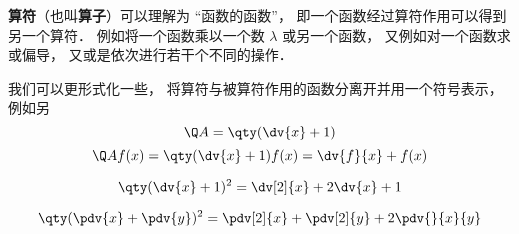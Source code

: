 
\textbf{算符}（也叫\textbf{算子}）可以理解为 “函数的函数”， 即一个函数经过算符作用可以得到另一个算符． 例如将一个函数乘以一个数 $\lambda$ 或另一个函数， 又例如对一个函数求或偏导， 又或是依次进行若干个不同的操作．

我们可以更形式化一些， 将算符与被算符作用的函数分离开并用一个符号表示， 例如另
\begin{equation}
\Q A = \qty(\dv{x} + 1)
\end{equation}
\begin{equation}
\Q A f(x) = \qty(\dv{x} + 1)f(x) = \dv{f}{x} + f(x)
\end{equation}

\begin{equation}
\qty(\dv{x} + 1)^2 = \dv[2]{x} + 2\dv{x} + 1
\end{equation}

\begin{equation}
\qty(\pdv{x} + \pdv{y})^2 = \pdv[2]{x} + \pdv[2]{y} + 2\pdv{}{x}{y}
\end{equation}

\begin{equation}

\end{equation}